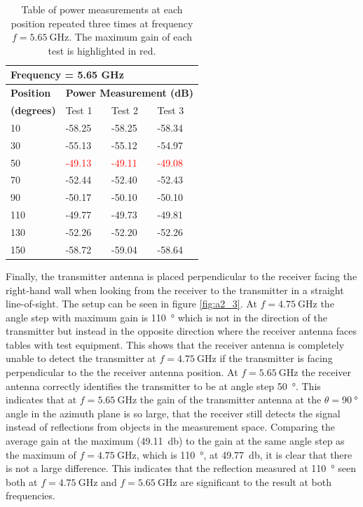 \begin{table}[H]
    \centering
    \begin{tabular}{l|l|l|l}
        \multicolumn{4}{l}{\textbf{Frequency = 5.65 GHz}}         \\
        \hline
        \textbf{Position} & \multicolumn{3}{l}{\textbf{Power Measurement (dB)}} \\
        \textbf{(degrees)}  & Test 1    & Test 2  & Test 3  \\
        \hline
        \hline
        10      & -58.25    & -58.25    & -58.34 \\
        30      & -55.13    & -55.12    & -54.97 \\
        50      & \textcolor{red}{-49.13}    & \textcolor{red}{-49.11}    & \textcolor{red}{-49.08} \\
        70      & -52.44    & -52.40    & -52.43 \\
        90      & -50.17    & -50.10    & -50.10 \\
        110     & -49.77    & -49.73    & -49.81 \\
        130     & -52.26    & -52.20    & -52.26 \\
        150     & -58.72    & -59.04    & -58.64
        \end{tabular}
    \caption{Table of power measurements at each position repeated three times at frequency $f=\SI{5.65}{\giga\hertz}$. The maximum gain of each test is highlighted in red.}
    \label{tab:a2_3b}
\end{table}

Finally, the transmitter antenna is placed perpendicular to the receiver facing the right-hand wall when looking from the receiver to the transmitter in a straight line-of-sight. The setup can be seen in figure \ref{fig:a2_3}. At $f=\SI{4.75}{\giga\hertz}$ the angle step with maximum gain is \SI{110}{\degree} which is not in the direction of the transmitter but instead in the opposite direction where the receiver antenna faces tables with test equipment. This shows that the receiver antenna is completely unable to detect the transmitter at $f=\SI{4.75}{\giga\hertz}$ if the transmitter is facing perpendicular to the the receiver antenna position. At $f=\SI{5.65}{\giga\hertz}$ the receiver antenna correctly identifies the transmitter to be at angle step \SI{50}{\degree}. This indicates that at $f=\SI{5.65}{\giga\hertz}$ the gain of the transmitter antenna at the $\theta=\SI{90}{\degree}$ angle in the azimuth plane is so large, that the receiver still detects the signal instead of reflections from objects in the measurement space. Comparing the average gain at the maximum (\SI{49.11}{\decibel}) to the gain at the same angle step as the maximum of $f=\SI{4.75}{\giga\hertz}$, which is \SI{110}{\degree}, at \SI{49.77}{\decibel}, it is clear that there is not a large difference. This indicates that the reflection measured at \SI{110}{\degree} seen both at $f=\SI{4.75}{\giga\hertz}$ and $f=\SI{5.65}{\giga\hertz}$ are significant to the result at both frequencies.


